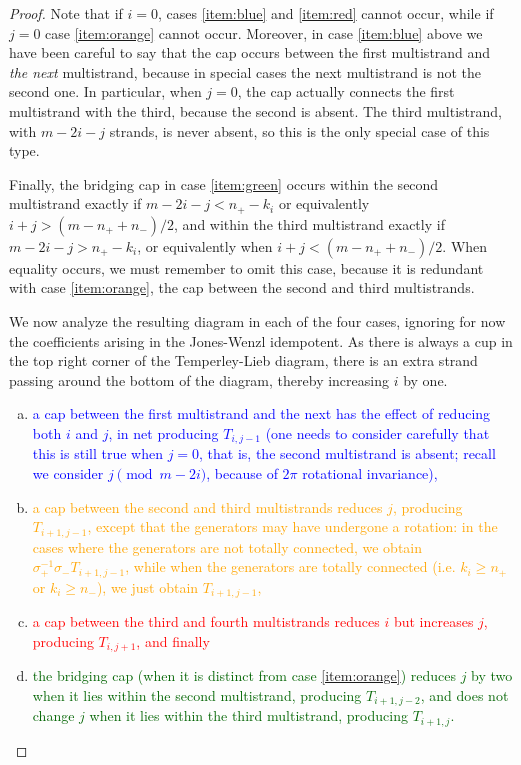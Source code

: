 \documentclass[12pt]{article}
\begin{document}
\begin{proof}
Note that if $i=0$, cases \eqref{item:blue} and \eqref{item:red} cannot occur, while if $j=0$ case \eqref{item:orange} cannot occur. Moreover, in case \eqref{item:blue} above we have been careful to say that the cap occurs between the first multistrand and \emph{the next} multistrand, because in special cases the next multistrand is not the second one. In particular, when $j=0$, the cap actually connects the first multistrand with the third, because the second is absent. The third multistrand, with $m-2i-j$ strands, is never absent, so this is the only special case of this type.

Finally, the bridging cap in case \eqref{item:green} occurs within the second multistrand exactly if $m-2i-j < n_+ - k_i$ or equivalently $i+j > (m - n_+ + n_-)/2$, and within the third multistrand exactly if $m-2i-j > n_+ - k_i$, or equivalently when $i+j < (m - n_+ + n_-)/2$. When equality occurs, we must remember to omit this case, because it is redundant with case \eqref{item:orange}, the cap between the second and third multistrands.

We now analyze the resulting diagram in each of the four cases, ignoring for now the coefficients arising in the Jones-Wenzl idempotent. As there is always a cup in the top right corner of the Temperley-Lieb diagram, there is an extra strand passing around the bottom of the diagram, thereby increasing $i$ by one.
\begin{enumerate}[(a)]
\item
\textcolor{blue}{
a cap between the first multistrand and the next has the effect of reducing both $i$ and $j$, in net producing $T_{i,j-1}$ (one needs to consider carefully that this is still true when $j=0$, that is, the second multistrand is absent; recall we consider $j \pmod{m-2i}$, because of $2\pi$ rotational invariance),
}
\item
\textcolor{orange}{
a cap between the second and third multistrands reduces $j$, producing $T_{i+1, j-1}$, except that the generators may have undergone a rotation: in the cases where the generators are not totally connected, we obtain $\sigma_+^{-1} \sigma_- T_{i+1, j-1}$, while when the generators are totally connected (i.e. $k_i \geq n_+$ or $k_i \geq   n_-$), we just obtain $T_{i+1,j-1}$,
}
\item
\textcolor{red}{
a cap between the third and fourth multistrands reduces $i$ but increases $j$, producing $T_{i, j+1}$, and finally
}
\item
\textcolor{DarkGreen}{
the bridging cap (when it is distinct from case \eqref{item:orange}) reduces $j$ by two when it lies within the second multistrand, producing $T_{i+1, j - 2}$, and does not change $j$ when it lies within the third multistrand, producing $T_{i+1, j}$. 
}
\end{enumerate}


\end{proof}
\end{document}
